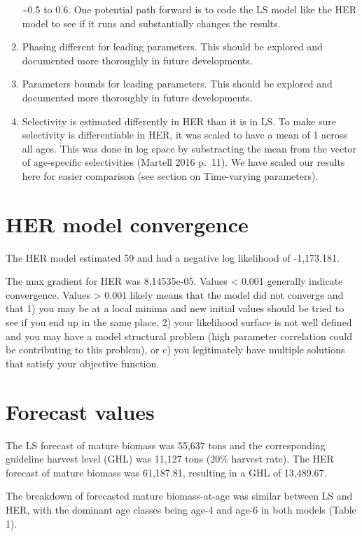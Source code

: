 \documentclass[]{article}
\begin{document}
\begin{enumerate}
  \textasciitilde{}0.5 to 0.6. One potential path forward is to code the
  LS model like the HER model to see if it runs and substantially
  changes the results.
\item
  Phasing different for leading parameters. This should be explored and
  documented more thoroughly in future developments.
\item
  Parameters bounds for leading parameters. This should be explored and
  documented more thoroughly in future developments.
\item
  Selectivity is estimated differently in HER than it is in LS. To make
  sure selectivity is differentiable in HER, it was scaled to have a
  mean of 1 across all ages. This was done in log space by substracting
  the mean from the vector of age-specific selectivities (Martell 2016
  p.~11). We have scaled our results here for easier comparison (see
  section on Time-varying parameters).
\end{enumerate}

\section{HER model convergence}\label{her-model-convergence}

The HER model estimated 59 and had a negative log likelihood of
-1,173.181.

The max gradient for HER was 8.14535e-05. Values \textless{} 0.001
generally indicate convergence. Values \textgreater{} 0.001 likely means
that the model did not converge and that 1) you may be at a local minima
and new initial values should be tried to see if you end up in the same
place, 2) your likelihood surface is not well defined and you may have a
model structural problem (high parameter correlation could be
contributing to this problem), or c) you legitimately have multiple
solutions that satisfy your objective function.

\section{Forecast values}\label{forecast-values}

The LS forecast of mature biomass was 55,637 tons and the corresponding
guideline harvest level (GHL) was 11,127 tons (20\% harvest rate). The
HER forecast of mature biomass was 61,187.81, resulting in a GHL of
13,489.67.

The breakdown of forecasted mature biomass-at-age was similar between LS
and HER, with the dominant age classes being age-4 and age-6 in both
models (Table 1).
\end{document}
